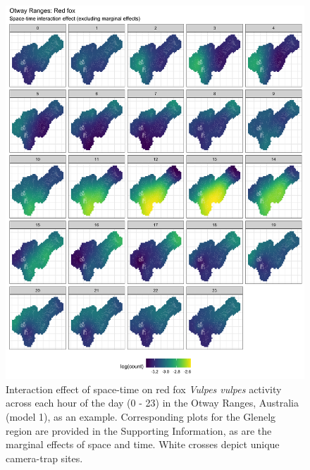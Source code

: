 \documentclass[11pt,a4paper,titlepage,twoside,openright]{style/unimelbthesis}
\begin{document}
\begin{mainmatter}
\begin{figure}
{\centering \includegraphics[width=1\linewidth]{figure/spte_diff_avg_o_fox} 

}

\caption{Interaction effect of space-time on red fox \textit{Vulpes vulpes} activity across each hour of the day (0 - 23) in the Otway Ranges, Australia (model 1), as an example. Corresponding plots for the Glenelg region are provided in the Supporting Information, as are the marginal effects of space and time. White crosses depict unique camera-trap sites.}\label{fig:diel-st-int-o-fox}
\end{figure}
\begin{figure}


\end{figure}
\end{mainmatter}
\end{document}
